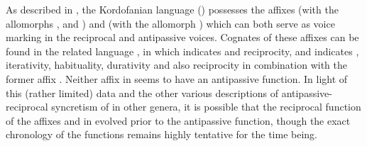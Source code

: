 As described in , the Kordofanian language  () possesses the affixes  (with the allomorphs ,  and ) and  (with the allomorph ) which can both serve as voice marking in the reciprocal and antipassive voices. Cognates of these affixes can be found in the related language , in which  indicates  and reciprocity, and  indicates , iterativity, habituality, durativity and also reciprocity in combination with the former affix \citep[98ff., 128ff.]{vanderelst:2016}. Neither affix in  seems to have an antipassive function. In light of this (rather limited) data and the other various descriptions of antipassive-reciprocal syncretism of  in other genera, it is possible that the reciprocal function of the affixes  and  in  evolved prior to the antipassive function, though the exact chronology of the functions remains highly tentative for the time being.

